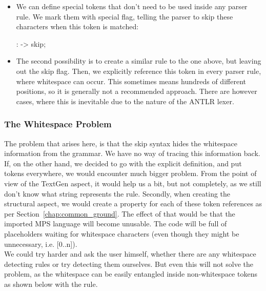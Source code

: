 \begin{itemize}
	\item We can define special tokens that don't need to be used inside any parser rule.
	We mark them with special flag, telling the parser to skip these characters when this token is matched:

	\begin{antlr}
		   :     -> skip;
	\end{antlr}

	\item The second possibility is to create a similar rule to the one above, but leaving out the skip flag.
	Then, we explicitly reference this token in every parser rule, where whitespace can occur.
	This sometimes means hundreds of different positions, so it is generally not a recommended approach.
	There are however cases, where this is inevitable due to the nature of the ANTLR lexer.
\end{itemize}

\subsubsection{The Whitespace Problem}

The problem that arises here, is that the skip syntax hides the whitespace information from the grammar.
We have no way of tracing this information back.
If, on the other hand, we decided to go with the explicit definition, and put  tokens everywhere, we would encounter much bigger problem.
From the point of view of the TextGen aspect, it would help us a bit, but not completely, as we still don't know what string represents the rule.
Secondly, when creating the structural aspect, we would create a property for each of these token references as per Section~\ref{chap:common_ground}.
The effect of that would be that the imported MPS language will become unusable.
The code will be full of placeholders waiting for whitespace characters (even though they might be unnecessary, i.e. [0..n]).
\\

We could try harder and ask the user himself, whether there are any whitespace detecting rules or try detecting them ourselves.
But even this will not solve the problem, as the whitespace can be easily entangled inside non-whitespace tokens as shown below with the  rule.
\\

